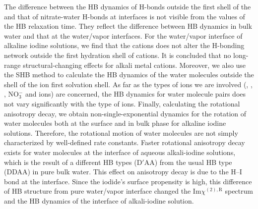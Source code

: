 The difference between the HB dynamics of H-bonds outside the first shell of the \Li and that of nitrate-water H-bonds 
at interfaces is not visible from the values of the HB relaxation time. They reflect the difference between HB dynamics in 
bulk water and that at the water/vapor interfaces. For the water/vapor interface of alkaline iodine solutions, we find 
that the cations does not alter the H-bonding network outside the first hydration shell of cations. 
It is concluded that no long-range structural-changing effects for alkali metal cations.
Moreover, we also use the SHB method to calculate the HB dynamics of the water molecules outside the shell of the ion first solvation shell.
As far as the types of ions we are involved (\Li, \Na, \K, NO$^-_3$ and \I ions) are concerned, 
the HB dynamics for water molecule pairs does not vary significantly with the type of ions.
Finally, calculating the rotational anisotropy decay, we obtain non-single-exponential dynamics 
for the rotation of water molecules both at the surface and in bulk phase for alkaline 
iodine solutions. Therefore, the rotational motion of water molecules are not simply characterized by well-defined rate constants. 
Faster rotational anisotropy decay exists for water molecules at the interface of aqueous alkali-iodine solutions, 
which is the result of a different HB types (D$'$AA) from the usual HB type (DDAA) in pure bulk water. 
This effect on anisotropy decay is due to the H--I bond at the interface. Since the iodide's surface propensity is high, 
this difference of HB structure from pure water/vapor interface changed the Im$\chi^{(2),\text{R}}$ spectrum and the HB dynamics 
of the interface of alkali-iodine solution. 


